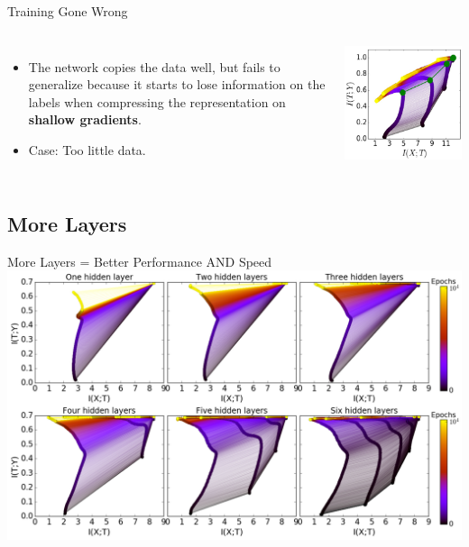\documentclass{beamer}
\begin{document}
\begin{frame}{Training Gone Wrong}
    \begin{columns}
            \begin{itemize}
                \item The network \alert{copies} the data well, but fails to generalize because it starts to lose information on the labels when compressing the representation on \textbf{shallow gradients}.
                \item Case: Too little data.
            \end{itemize}
            \includegraphics[scale=0.6]{Screenshot_10.png}
            \cite{Paper}
    \end{columns}
\end{frame}


\subsection{More Layers}

\begin{frame}{More Layers = Better Performance AND Speed}
    \centering
        \includegraphics[scale=0.3]{Screenshot_13.png}
        \cite{Paper}
\end{frame}
\end{document}
